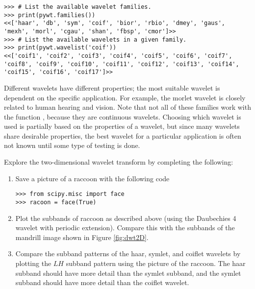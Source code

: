 \begin{lstlisting}
>>> # List the available wavelet families.
>>> print(pywt.families())
<<['haar', 'db', 'sym', 'coif', 'bior', 'rbio', 'dmey', 'gaus', 'mexh', 'morl', 'cgau', 'shan', 'fbsp', 'cmor']>>
>>> # List the available wavelets in a given family.
>>> print(pywt.wavelist('coif'))
<<['coif1', 'coif2', 'coif3', 'coif4', 'coif5', 'coif6', 'coif7', 'coif8', 'coif9', 'coif10', 'coif11', 'coif12', 'coif13', 'coif14', 'coif15', 'coif16', 'coif17']>>
\end{lstlisting}

Different wavelets have different properties; the most suitable wavelet is dependent on the specific application.
For example, the morlet wavelet is closely related to human hearing and vision.
Note that not all of these families work with the function , because they are continuous wavelets.
Choosing which wavelet is used is partially based on the properties of a wavelet, but since many wavelets share desirable properties, the best wavelet for a particular application is often not known until
some type of testing is done.

\begin{comment}
\begin{figure}
\begin{subfigure}[b]{0.45\textwidth}
    \texttt{[image: figures/mexicanHat]}
\end{subfigure}
\begin{subfigure}[b]{0.45\textwidth}
    \texttt{[image: figures/db5\_3]}
\end{subfigure}
\caption{Mexican Hat and Daubechies 4 mother wavelets.}
\label{fig:more_wavelets}
\end{figure}
\end{comment}

\begin{problem}
Explore the two-dimensional wavelet transform by completing the following:
\begin{enumerate}
    \item Save a picture of a raccoon with the following code
\begin{lstlisting}
>>> from scipy.misc import face
>>> racoon = face(True)
\end{lstlisting}
    \item Plot the subbands of raccoon as described above (using the Daubechies 4 wavelet with periodic extension).
        Compare this with the subbands of the mandrill image shown in Figure \ref{fig:dwt2D}.
    \item Compare the subband patterns of the haar, symlet, and coiflet wavelets by plotting the $LH$ subband pattern using the picture of the raccoon.
    The haar subband should have more detail than the symlet subband, and the symlet subband should have more detail than the coiflet wavelet.
\end{enumerate}
\end{problem}

